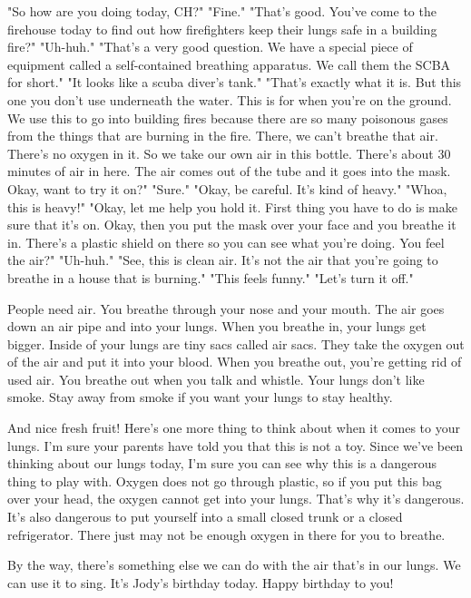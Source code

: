 "So how are you doing today, CH?"
"Fine."
"That's good. You've come to the firehouse today to find out how firefighters keep their lungs safe in a building fire?"
"Uh-huh."
"That's a very good question. We have a special piece of equipment called a self-contained breathing apparatus. We call them the SCBA for short."
"It looks like a scuba diver's tank."
"That's exactly what it is. But this one you don't use underneath the water. This is for when you're on the ground. We use this to go into building fires because there are so many poisonous gases from the things that are burning in the fire. There, we can't breathe that air. There's no oxygen in it. So we take our own air in this bottle. There's about 30 minutes of air in here. The air comes out of the tube and it goes into the mask. Okay, want to try it on?"
"Sure."
"Okay, be careful. It's kind of heavy."
"Whoa, this is heavy!"
"Okay, let me help you hold it. First thing you have to do is make sure that it's on. Okay, then you put the mask over your face and you breathe it in. There's a plastic shield on there so you can see what you're doing. You feel the air?"
"Uh-huh."
"See, this is clean air. It's not the air that you're going to breathe in a house that is burning."
"This feels funny."
"Let's turn it off."

People need air. You breathe through your nose and your mouth. The air goes down an air pipe and into your lungs. When you breathe in, your lungs get bigger. Inside of your lungs are tiny sacs called air sacs. They take the oxygen out of the air and put it into your blood. When you breathe out, you're getting rid of used air. You breathe out when you talk and whistle. Your lungs don't like smoke. Stay away from smoke if you want your lungs to stay healthy.

And nice fresh fruit! Here's one more thing to think about when it comes to your lungs. I'm sure your parents have told you that this is not a toy. Since we've been thinking about our lungs today, I'm sure you can see why this is a dangerous thing to play with. Oxygen does not go through plastic, so if you put this bag over your head, the oxygen cannot get into your lungs. That's why it's dangerous. It's also dangerous to put yourself into a small closed trunk or a closed refrigerator. There just may not be enough oxygen in there for you to breathe.

By the way, there's something else we can do with the air that's in our lungs. We can use it to sing. It's Jody's birthday today. Happy birthday to you!


